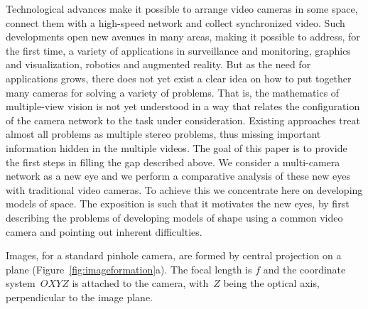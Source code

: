 \documentclass[10pt,twocolumn]{article}
\begin{document}


Technological advances make it possible to arrange video cameras in
some space, connect them with a high-speed network and collect
synchronized video. Such developments open new avenues in many areas,
making it possible to address, for the first time, a variety of
applications in surveillance and monitoring, graphics and
visualization, robotics and augmented reality. But as the need for
applications grows, there does not yet exist a clear idea on how to
put together many cameras for solving a variety of problems. That is,
the mathematics of multiple-view vision is not yet understood in a way
that relates the configuration of the camera network to the task under
consideration. Existing approaches treat almost all problems as
multiple stereo problems, thus missing important information hidden in
the multiple videos. The goal of this paper is to provide the first
steps in filling the gap described above. We consider a multi-camera
network as a new eye and we perform a comparative analysis of these
new eyes with traditional video cameras. To achieve this we
concentrate here on developing models of space. The exposition is such that it motivates the new
eyes, by first describing the problems of developing models of shape
using a common video camera and pointing out inherent difficulties.

Images, for a standard pinhole camera, are formed by central
projection on a plane (Figure~\ref{fig:imageformation}a). The focal
length is $f$ and the coordinate system~$OXYZ$ is attached to the
camera, with~$Z$ being the optical axis, perpendicular to the image
plane.

\end{document}
